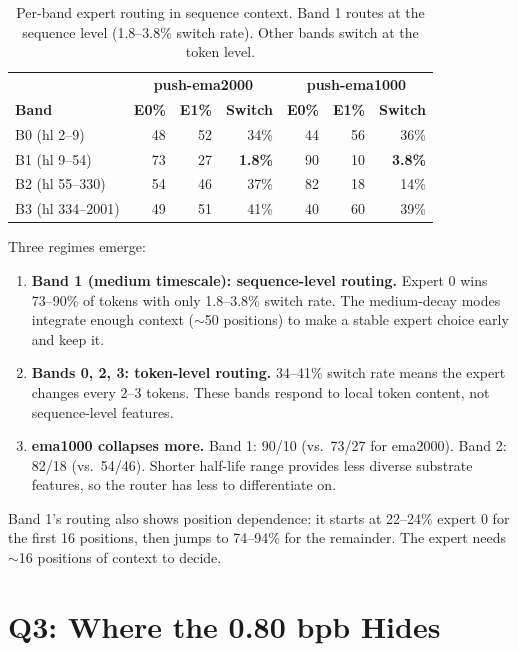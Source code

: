 \documentclass[11pt,a4paper]{report}
\begin{document}
\begin{table}[h]
\centering
\begin{tabular}{lrrr|rrr}
\toprule
& \multicolumn{3}{c}{\textbf{push-ema2000}} & \multicolumn{3}{c}{\textbf{push-ema1000}} \\
\textbf{Band} & \textbf{E0\%} & \textbf{E1\%} & \textbf{Switch} & \textbf{E0\%} & \textbf{E1\%} & \textbf{Switch} \\
\midrule
B0 (hl 2--9) & 48 & 52 & 34\% & 44 & 56 & 36\% \\
B1 (hl 9--54) & 73 & 27 & \textbf{1.8\%} & 90 & 10 & \textbf{3.8\%} \\
B2 (hl 55--330) & 54 & 46 & 37\% & 82 & 18 & 14\% \\
B3 (hl 334--2001) & 49 & 51 & 41\% & 40 & 60 & 39\% \\
\bottomrule
\end{tabular}
\caption{Per-band expert routing in sequence context. Band 1 routes at the sequence level (1.8--3.8\% switch rate). Other bands switch at the token level.}
\label{tab:routing_sequence}
\end{table}

Three regimes emerge:

\begin{enumerate}
\item \textbf{Band 1 (medium timescale): sequence-level routing.} Expert 0 wins 73--90\% of tokens with only 1.8--3.8\% switch rate. The medium-decay modes integrate enough context ($\sim$50 positions) to make a stable expert choice early and keep it.
\item \textbf{Bands 0, 2, 3: token-level routing.} 34--41\% switch rate means the expert changes every 2--3 tokens. These bands respond to local token content, not sequence-level features.
\item \textbf{ema1000 collapses more.} Band 1: 90/10 (vs.\ 73/27 for ema2000). Band 2: 82/18 (vs.\ 54/46). Shorter half-life range provides less diverse substrate features, so the router has less to differentiate on.
\end{enumerate}

Band 1's routing also shows position dependence: it starts at 22--24\% expert 0 for the first 16 positions, then jumps to 74--94\% for the remainder. The expert needs $\sim$16 positions of context to decide.


\section{Q3: Where the 0.80 bpb Hides}
\end{document}
